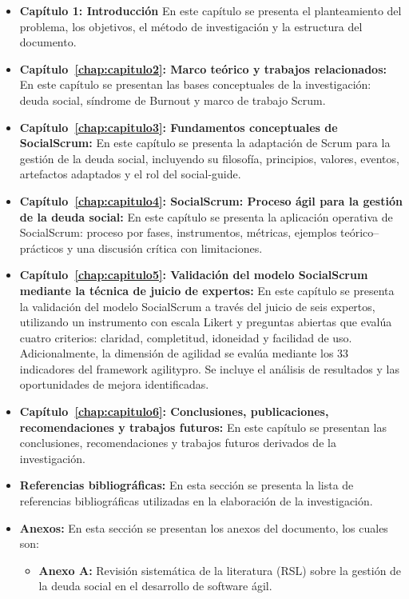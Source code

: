 \begin{itemize}
    \item \textbf{Capítulo 1: Introducción} En este capítulo se presenta el planteamiento del problema, los objetivos, el método de investigación y la estructura del documento.
    \item \textbf{Capítulo~\ref{chap:capitulo2}: Marco teórico y trabajos relacionados:} En este capítulo se presentan las bases conceptuales de la investigación: deuda social, síndrome de Burnout y marco de trabajo Scrum.
    \item \textbf{Capítulo~\ref{chap:capitulo3}: Fundamentos conceptuales de SocialScrum:} En este capítulo se presenta la adaptación de Scrum para la gestión de la deuda social, incluyendo su filosofía, principios, valores, eventos, artefactos adaptados y el rol del \gls{social-guide}.
    \item \textbf{Capítulo~\ref{chap:capitulo4}: SocialScrum: Proceso ágil para la gestión de la deuda social:} En este capítulo se presenta la aplicación operativa de SocialScrum: proceso por fases, instrumentos, métricas, ejemplos teórico–prácticos y una discusión crítica con limitaciones.
    \item \textbf{Capítulo~\ref{chap:capitulo5}: Validación del modelo SocialScrum mediante la técnica de juicio de expertos:} En este capítulo se presenta la validación del modelo SocialScrum a través del juicio de seis expertos, utilizando un instrumento con escala Likert y preguntas abiertas que evalúa cuatro criterios: claridad, completitud, idoneidad y facilidad de uso. Adicionalmente, la dimensión de agilidad se evalúa mediante los 33 indicadores del framework \gls{agilitypro}. Se incluye el análisis de resultados y las oportunidades de mejora identificadas.
    \item \textbf{Capítulo~\ref{chap:capitulo6}: Conclusiones, publicaciones, recomendaciones y trabajos futuros:} En este capítulo se presentan las conclusiones, recomendaciones y trabajos futuros derivados de la investigación.
    \item \textbf{Referencias bibliográficas:} En esta sección se presenta la lista de referencias bibliográficas utilizadas en la elaboración de la investigación.
    \item \textbf{Anexos:} En esta sección se presentan los anexos del documento, los cuales son:
          \begin{itemize}
              \item \textbf{Anexo A:} Revisión sistemática de la literatura (RSL) sobre la gestión de la deuda social en el desarrollo de software ágil.

\end{itemize}
\end{itemize}
